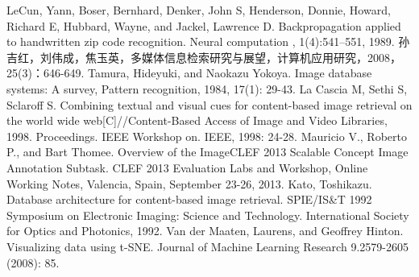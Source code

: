 \begin{thebibliography}{99}
LeCun, Yann, Boser, Bernhard, Denker, John S, Henderson, Donnie, Howard, Richard E, Hubbard, Wayne, and Jackel, Lawrence D.  Backpropagation applied to handwritten zip code recognition. Neural computation , 1(4):541–551, 1989.
孙吉红，刘伟成，焦玉英，多媒体信息检索研究与展望，计算机应用研究，2008， 25(3)：646-649.
Tamura, Hideyuki, and Naokazu Yokoya. Image database systems: A survey, Pattern recognition, 1984, 17(1): 29-43.
La Cascia M, Sethi S, Sclaroff S. Combining textual and visual cues for content-based image retrieval on the world wide web[C]//Content-Based Access of Image and Video Libraries, 1998. Proceedings. IEEE Workshop on. IEEE, 1998: 24-28.
Mauricio V., Roberto P., and Bart Thomee. Overview of the ImageCLEF 2013 Scalable Concept Image Annotation Subtask. CLEF 2013 Evaluation Labs and Workshop, Online Working Notes, Valencia, Spain, September 23-26, 2013.
Kato, Toshikazu. Database architecture for content-based image retrieval. SPIE/IS\&T 1992 Symposium on Electronic Imaging: Science and Technology. International Society for Optics and Photonics, 1992.
Van der Maaten, Laurens, and Geoffrey Hinton. Visualizing data using t-SNE. Journal of Machine Learning Research 9.2579-2605 (2008): 85.


\end{thebibliography}

